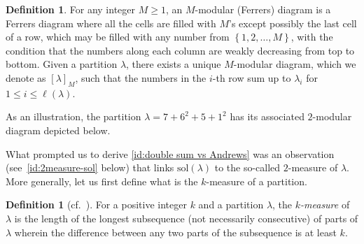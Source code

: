\documentclass[11pt,reqno]{amsart}
\numberwithin{equation}{section}
\theoremstyle{plain}
\theoremstyle{definition}
\newtheorem{Def}[theorem]{Definition}
\theoremstyle{named}
\newcommand{\set}[1]{\left\{#1\right\}}
\def\la{\lambda}
\def\sol{\mathrm{sol}}
\begin{document}
\begin{Def}
For any integer $M\ge 1$, an $M$-modular (Ferrers) diagram is a Ferrers diagram where all the cells are filled with $M$'s except possibly the last cell of a row, which may be filled with any number from $\set{1,2,\ldots,M}$, with the condition that the numbers along each column are weakly decreasing from top to bottom. Given a partition $\la$, there exists a unique $M$-modular diagram, which we denote as $[\la]_M$, such that the numbers in the $i$-th row sum up to $\la_i$ for $1\le i\le \ell(\la)$.
\end{Def}

As an illustration, the partition $\lambda=7+6^2+5+1^2$ has its associated $2$-modular diagram depicted below.

\begin{ferrers}

\addtext{1.5}{-3}{$[\la]_2$}
\end{ferrers}


What prompted us to derive \eqref{id:double sum vs Andrews} was an observation (see~\eqref{id:2measure-sol} below) that links $\sol(\la)$ to the so-called $2$-measure of $\la$. More generally, let us first define what is the $k$-measure of a partition.

\begin{Def}[{cf.~\cite[Defn.~1]{ABD22}}]\label{def:k-measure}
For a positive integer $k$ and a partition $\la$, the {\it $k$-measure} of $\la$ is the length of the longest subsequence (not necessarily consecutive) of parts of $\la$ wherein the difference between any two parts of the subsequence is at least $k$.
\end{Def}
\end{document}
